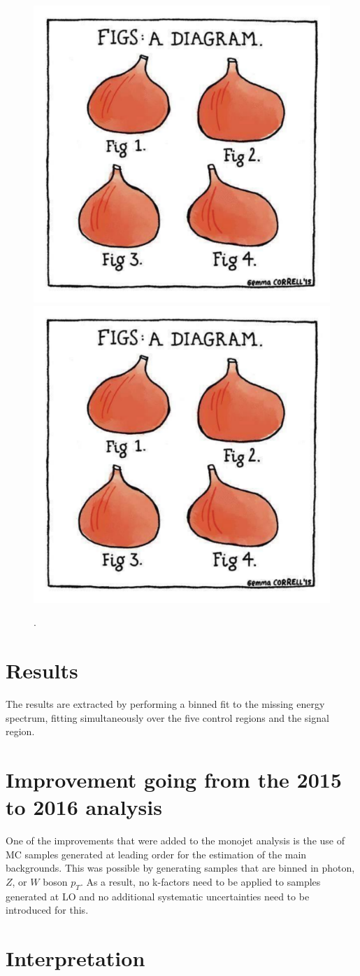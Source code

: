 \begin{figure}[ht]
  \centering
 \includegraphics[width=.49\textwidth]{fig.pdf} 
 \includegraphics[width=.49\textwidth]{fig.pdf}
 \caption{.}
 \label{fig:transfer_factors_unc}
\end{figure}

\section{Results}
\label{sec:results}

The results are extracted by performing a binned fit to the missing energy spectrum, fitting simultaneously over the five control regions and the signal region. 

\section{Improvement going from the 2015 to 2016 analysis}
\label{sec:improvement}

One of the improvements that were added to the monojet analysis is the use of MC samples generated at leading order for the estimation of the main backgrounds. This was possible by generating samples that are binned in photon, $Z$, or $W$ boson $p_T$. As a result, no k-factors need to be applied to samples generated at LO and no additional systematic uncertainties need to be introduced for this.

\section{Interpretation}
\label{sec:interpretation}

\clearpage{\pagestyle{empty}\cleardoublepage}

